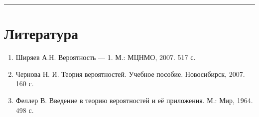 \documentclass[11pt,a4paper]{article}
\providecommand{\tightlist}{%
      \setlength{\itemsep}{0pt}\setlength{\parskip}{0pt}}
\begin{document}
    \begin{center}\rule{0.5\linewidth}{\linethickness}\end{center}

    \hypertarget{ux43bux438ux442ux435ux440ux430ux442ux443ux440ux430}{%
\section*{Литература}\label{ux43bux438ux442ux435ux440ux430ux442ux443ux440ux430}}

\begin{enumerate}
\def\labelenumi{\arabic{enumi}.}
\tightlist
\item
  Ширяев А.Н. Вероятность --- 1. М.: МЦНМО, 2007. 517 с.
\item
  Чернова Н. И. Теория вероятностей. Учебное пособие. Новосибирск, 2007.
  160 с.
\item
  Феллер В. Введение в теорию вероятностей и её приложения. М.: Мир,
  1964. 498 с.
\end{enumerate}


    
    
    
\end{document}
